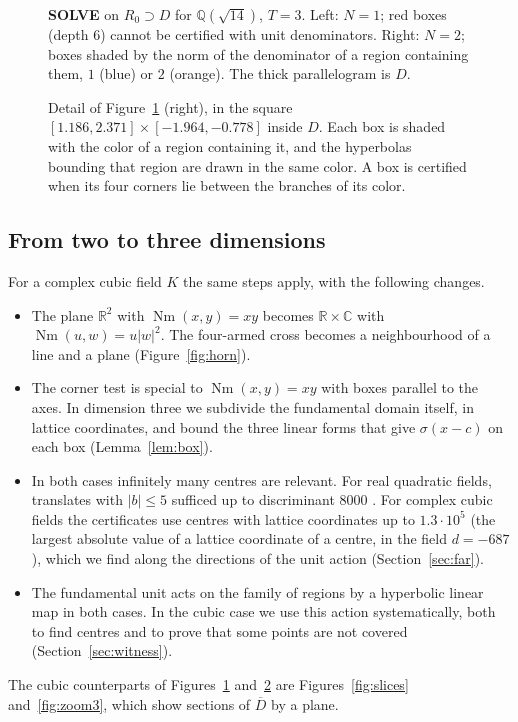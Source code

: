 \documentclass[11pt]{amsart}
\theoremstyle{definition}
\theoremstyle{remark}
\numberwithin{equation}{section}
\newcommand{\Q}{\mathbb{Q}}
\newcommand{\R}{\mathbb{R}}
\newcommand{\C}{\mathbb{C}}
\newcommand{\Nm}{\operatorname{Nm}}
\begin{document}
\begin{figure}[ht]
\centering

\caption{\textbf{SOLVE} on $R_0\supset D$ for $\Q(\sqrt{14})$, $T=3$. Left: $N=1$; red boxes
(depth $6$) cannot be certified with unit denominators. Right: $N=2$; boxes shaded by the norm of
the denominator of a region containing them, $1$ (blue) or $2$ (orange). The thick parallelogram
is $D$.}
\label{fig:q-solve}
\end{figure}

\begin{figure}[ht]
\centering

\caption{Detail of Figure~\ref{fig:q-solve} (right), in the square
$[1.186,2.371]\times[-1.964,-0.778]$ inside $D$. Each box is shaded with the color of a region
containing it, and the hyperbolas bounding that region are drawn in the same color. A box is
certified when its four corners lie between the branches of its color.}
\label{fig:q-zoom}
\end{figure}

\subsection{From two to three dimensions}\label{sec:changes} For a complex cubic field $K$ the
same steps apply, with the following changes.
\begin{itemize}
\item The plane $\R^2$ with $\Nm(x,y)=xy$ becomes $\R\times\C$ with $\Nm(u,w)=u|w|^2$. The
four-armed cross becomes a neighbourhood of a line and a plane (Figure~\ref{fig:horn}).
\item The corner test is special to $\Nm(x,y)=xy$ with boxes parallel to the axes. In dimension
three we subdivide the fundamental domain itself, in lattice coordinates, and bound the three
linear forms that give $\sigma(x-c)$ on each box (Lemma~\ref{lem:box}).
\item In both cases infinitely many centres are relevant. For real quadratic fields, translates
with $|b|\le5$ sufficed up to discriminant $8000$ \cite{GM}. For complex cubic fields the
certificates use centres with lattice coordinates up to $1.3\cdot10^5$ (the largest absolute
value of a lattice coordinate of a centre, in the field $d=-687$), which we find along the
directions of the unit action (Section~\ref{sec:far}).
\item The fundamental unit acts on the family of regions by a hyperbolic linear map in both
cases. In the cubic case we use this action systematically, both to find centres and to prove
that some points are not covered (Section~\ref{sec:witness}).
\end{itemize}
The cubic counterparts of Figures~\ref{fig:q-solve} and~\ref{fig:q-zoom} are
Figures~\ref{fig:slices} and~\ref{fig:zoom3}, which show sections of $\overline D$ by a plane.
\end{document}
